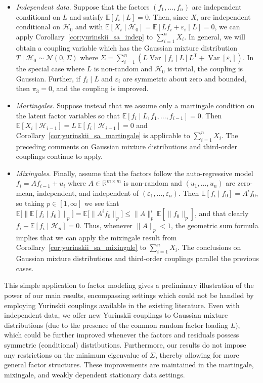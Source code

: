 \documentclass[11pt,lof]{puthesis}
\newcommand{\R}{\ensuremath{\mathbb{R}}}
\newcommand{\E}{\ensuremath{\mathbb{E}}}
\newcommand{\cH}{\ensuremath{\mathcal{H}}}
\newcommand{\cN}{\ensuremath{\mathcal{N}}}
\newcommand{\T}{\ensuremath{\mathsf{T}}}
\DeclareMathOperator{\Var}{Var}
\theoremstyle{break}
\theoremstyle{proof}
\begin{document}
\begin{itemize}
\item \emph{Independent data}.
Suppose that the factors $(f_1, \ldots,
f_n)$ are independent conditional on $L$ and satisfy
$\E [ f_i \mid L ] = 0$.
Then, since $X_i$ are independent conditional on $\cH_0$ and with
$\E [ X_i \mid \cH_0 ] = \E [ L f_i + \varepsilon_i \mid L ] = 0$,
we can apply Corollary~\ref{cor:yurinskii_sa_indep} to $\sum_{i=1}^n X_i$.
In general, we will obtain a coupling variable which has the Gaussian
mixture distribution $T \mid \cH_0 \sim \cN(0, \Sigma)$ where
$\Sigma= \sum_{i=1}^n (L\Var[f_i \mid L]L^\T +\Var[\varepsilon_i])$.
In the special case where $L$ is non-random
and $\cH_0$ is trivial, the coupling is Gaussian. Further,
if $f_i\mid L$ and $\varepsilon_i$ are symmetric about zero
and bounded, then $\pi_3=0$, and the coupling is improved.

\item \emph{Martingales}.
Suppose instead that we assume only a martingale
condition on the latent factor variables so that
$\E \left[ f_i \mid L, f_1, \ldots, f_{i-1} \right] = 0$.
Then $\E [ X_i \mid \cH_{i-1} ]
= L\, \E \left[ f_i \mid \cH_{i-1} \right] = 0$
and Corollary~\ref{cor:yurinskii_sa_martingale} is applicable to
$\sum_{i=1}^n X_i$.
The preceding comments on Gaussian mixture distributions
and third-order couplings continue to apply.

\item \emph{Mixingales}.
Finally, assume that the factors follow the
auto-regressive model $f_i = A f_{i-1} + u_i$ where
$A \in \R^{m \times m}$ is non-random and $(u_1, \ldots, u_n)$ are
zero-mean, independent, and independent of
$(\varepsilon_1, \ldots, \varepsilon_n)$.
Then $\E \left[ f_i \mid f_0 \right] = A^i f_0$, so taking
$p \in [1, \infty]$ we see that
$\E \big[ \| \E [ f_i \mid f_0 ] \|_p \big]
= \E \big[ \| A^i f_0 \|_p \big] \leq \|A\|_p^i\,\E [ \|f_0\|_p ]$,
and that clearly $f_i - \E [ f_i \mid \cH_n ] = 0$.
Thus, whenever $\|A\|_p < 1$, the geometric sum formula implies that
we can apply the mixingale result from
Corollary~\ref{cor:yurinskii_sa_mixingale} to
$\sum_{i=1}^n X_i$. The conclusions on Gaussian mixture distributions
and third-order couplings parallel the previous cases.
%
\end{itemize}

This simple application to factor modeling gives a preliminary illustration of
the power of our main results, encompassing settings which could not be handled
by employing Yurinskii couplings available in the existing literature. Even
with independent data, we offer new Yurinskii couplings to Gaussian mixture
distributions (due to the presence of the common random factor loading $L$),
which could be further improved whenever the factors and residuals possess
symmetric (conditional) distributions. Furthermore, our results do not impose
any restrictions on the minimum eigenvalue of $\Sigma$, thereby allowing for
more general factor structures. These improvements are maintained in the
martingale, mixingale, and weakly dependent stationary data settings.
\end{document}
